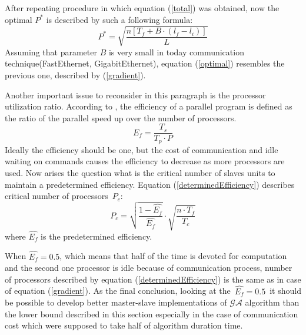 After repeating procedure in which equation (\ref{total}) was obtained, now the
optimal $P^*$ is described by such a following formula:
\begin{equation}
	P^*=\sqrt{\frac{n[T_f+B\cdot(l_f-l_i)]}{L}}
	\label{optimal}
\end{equation}
Assuming that parameter $B$ is very small in today communication
technique(FastEthernet, GigabitEthernet),
equation (\ref{optimal}) resembles the previous one, described by
(\ref{gradient}).

Another important issue to reconsider in this paragraph is the processor
utilization ratio. According to \cite{bib1}, the efficiency of a parallel
program is defined as the ratio of the parallel speed up over the number of
processors.
\begin{equation}
	E_f=\frac{T_s}{T_p\cdot P}
	\label{efficiency}
\end{equation}
Ideally the efficiency should be one, but the cost of communication and idle
waiting on commands causes the efficiency to decrease as more processors
are used. Now arises the question what is the critical number of slaves units to
maintain a predetermined efficiency. Equation (\ref{determinedEfficiency})
describes critical number of processors~$P_c$:
\begin{equation}
	P_c=\sqrt{\frac{1-\widehat{E_f}}{\widehat{E_f}}}\cdot\sqrt{\frac{n\cdot
	T_f}{T_c}}
	\label{determinedEfficiency}
\end{equation}
where $\widehat{E_f}$ is the predetermined efficiency. 

When $\widehat{E_f}=0.5$, which means that half of the time is devoted for computation 
and the second one processor is idle because of communication process, number of processors
described by equation (\ref{determinedEfficiency}) is the same as in case of
equation (\ref{gradient}). As the final conclusion, looking at
the~$\widehat{E_f}=0.5$~it should be possible to develop better master-slave
implementations of $\mathcal{GA}$ algorithm than the lower bound described in
this section especially in the case of communication cost which were supposed to
take half of algorithm duration time.

